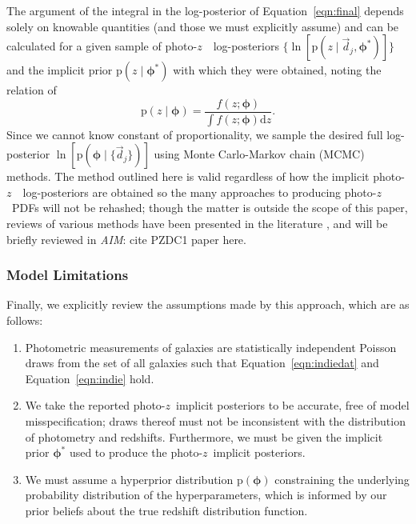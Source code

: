 \documentclass[iop]{emulateapj}
\newcommand{\todo}[3]{{\color{#2}\emph{#1}: #3}}
\newcommand{\aim}[1]{\todo{AIM}{red}{#1}}
\newcommand{\Eq}[1]{Equation~\ref{#1}}
\newcommand{\data}{\ensuremath{\vec{d}}}
\newcommand{\pr}[1]{\ensuremath{\mathrm{p}(#1)}}
\newcommand{\gvn}{\mid}%
\newcommand{\integral}[2]{\ensuremath{\int #1 \mathrm{d} #2}}
\newcommand{\pz}{photo-$z$~}
\newcommand{\pzpdf}{\pz PDF}
\newcommand{\pzip}{\pz implicit posterior}
\newcommand{\bvec}[1]{\ensuremath{\boldsymbol{#1}}}
\newcommand{\ndphi}{\bvec{\phi}}
\begin{document}
The argument of the integral in the log-posterior of \Eq{eqn:final} depends solely on knowable quantities (and those we must explicitly assume) and can be calculated for a given sample of \pz\ log-posteriors $\{\ln[\pr{z \gvn \data_{j}, \ndphi^{*}}]\}$ and the implicit prior $\pr{z \gvn \ndphi^{*}}$ with which they were obtained, noting the relation of 
\begin{equation}
\label{eqn:params}
\pr{z \gvn \ndphi} = \frac{f(z; \ndphi)}{\integral{f(z; \ndphi)}{z}}.
\end{equation}
Since we cannot know constant of proportionality, we sample the desired full log-posterior $\ln[\pr{\ndphi \gvn \{\data_{j}\}}]$ using Monte Carlo-Markov chain (MCMC) methods.  
The method outlined here is valid regardless of how the implicit \pz\ log-posteriors are obtained so the many approaches to producing \pzpdf s will not be rehashed; though the matter is outside the scope of this paper, reviews of various methods have been presented in the literature \citep{sheldon_photometric_2012, ball_robust_2008, carrasco_kind_tpz:_2013, carrasco_kind_exhausting_2014}, and will be briefly reviewed in \aim{cite PZDC1 paper here}.
%

\subsubsection{Model Limitations}
\label{sec:limitations}

Finally, we explicitly review the assumptions made by this approach, which are as follows:

\begin{enumerate}
	\item Photometric measurements of galaxies are statistically independent Poisson draws from the set of all galaxies such that \Eq{eqn:indiedat} and \Eq{eqn:indie} hold.
	\item We take the reported \pzip s to be accurate, free of model misspecification; draws thereof must not be inconsistent with the distribution of photometry and redshifts.
	Furthermore, we must be given the implicit prior $\ndphi^{*}$ used to produce the \pzip s.
	\item We must assume a hyperprior distribution $\pr{\ndphi}$ constraining the underlying probability distribution of the hyperparameters, which is informed by our prior beliefs about the true redshift distribution function.
\end{enumerate}
\end{document}
